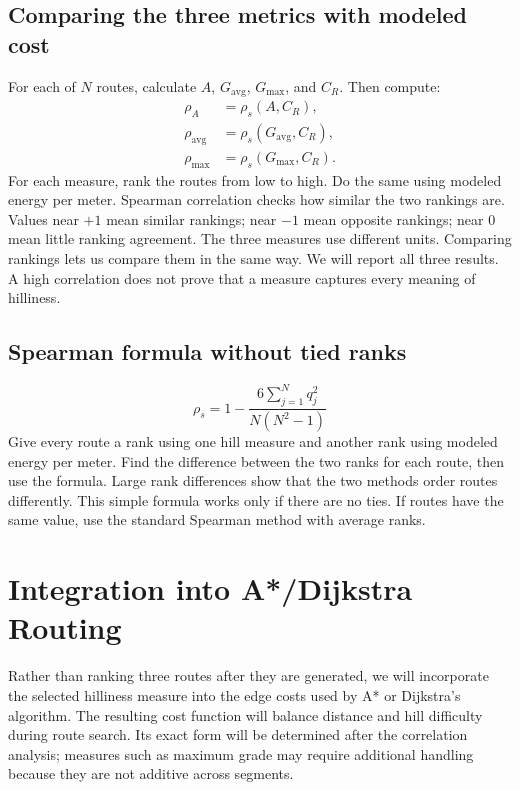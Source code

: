 \documentclass[11pt,letterpaper]{article}
\begin{document}
\subsection{Comparing the three metrics with modeled cost}
For each of $N$ routes, calculate $A$, $G_{\mathrm{avg}}$, $G_{\max}$, and $C_R$. Then compute:
\begin{equation}\boxed{\begin{aligned}\rho_A&=\rho_s(A,C_R),\\[3pt]\rho_{\mathrm{avg}}&=\rho_s(G_{\mathrm{avg}},C_R),\\[3pt]\rho_{\max}&=\rho_s(G_{\max},C_R).\end{aligned}}\end{equation}
For each measure, rank the routes from low to high. Do the same using modeled energy per meter. Spearman correlation checks how similar the two rankings are. Values near $+1$ mean similar rankings; near $-1$ mean opposite rankings; near $0$ mean little ranking agreement. The three measures use different units. Comparing rankings lets us compare them in the same way. We will report all three results. A high correlation does not prove that a measure captures every meaning of hilliness.

\subsection{Spearman formula without tied ranks}
\begin{equation}\boxed{\rho_s=1-\frac{6\displaystyle\sum_{j=1}^{N}q_j^2}{N(N^2-1)}}\end{equation}
Give every route a rank using one hill measure and another rank using modeled energy per meter. Find the difference between the two ranks for each route, then use the formula. Large rank differences show that the two methods order routes differently. This simple formula works only if there are no ties. If routes have the same value, use the standard Spearman method with average ranks.

\section{Integration into A*/Dijkstra Routing}
Rather than ranking three routes after they are generated, we will incorporate the selected hilliness measure into the edge costs used by A* or Dijkstra's algorithm. The resulting cost function will balance distance and hill difficulty during route search. Its exact form will be determined after the correlation analysis; measures such as maximum grade may require additional handling because they are not additive across segments.
\end{document}
